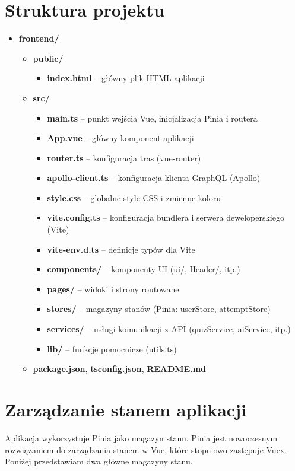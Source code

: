 \documentclass{article}
\begin{document}
    \section{Struktura projektu}
    \begin{itemize}
      \item \textbf{frontend/}
      \begin{itemize}
        \item \textbf{public/}
        \begin{itemize}
          \item \textbf{index.html} – główny plik HTML aplikacji
        \end{itemize}
        \item \textbf{src/}
        \begin{itemize}
          \item \textbf{main.ts} – punkt wejścia Vue, inicjalizacja Pinia i routera
          \item \textbf{App.vue} – główny komponent aplikacji
          \item \textbf{router.ts} – konfiguracja tras (vue-router)
          \item \textbf{apollo-client.ts} – konfiguracja klienta GraphQL (Apollo)
          \item \textbf{style.css} – globalne style CSS i zmienne koloru
          \item \textbf{vite.config.ts} – konfiguracja bundlera i serwera deweloperskiego (Vite)
          \item \textbf{vite-env.d.ts} – definicje typów dla Vite
          \item \textbf{components/} – komponenty UI (ui/, Header/, itp.)
          \item \textbf{pages/} – widoki i strony routowane
          \item \textbf{stores/} – magazyny stanów (Pinia: userStore, attemptStore)
          \item \textbf{services/} – usługi komunikacji z API (quizService, aiService, itp.)
          \item \textbf{lib/} – funkcje pomocnicze (utils.ts)
        \end{itemize}
        \item \textbf{package.json}, \textbf{tsconfig.json}, \textbf{README.md}
      \end{itemize}
    \end{itemize}

    \section{Zarządzanie stanem aplikacji}
      Aplikacja wykorzystuje Pinia jako magazyn stanu. Pinia jest nowoczesnym rozwiązaniem do zarządzania stanem w Vue, które stopniowo zastępuje Vuex. Poniżej przedstawiam dwa główne magazyny stanu.
\end{document}
